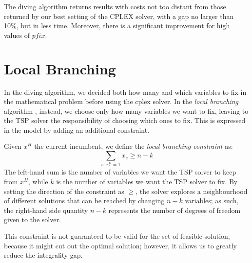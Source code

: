 The diving algorithm returns results with costs not too distant from those returned by our best setting of the CPLEX solver, with a gap no larger than 10\%, but in less time. Moreover, there is a significant improvement for high values of $pfix$.

\section{Local Branching}

In the diving algorithm, we decided both how many and which variables to fix in the mathematical problem before using the cplex solver. In the \textit{local branching} algorithm \cite{Fischetti2003}, instead, we choose only how many variables we want to fix, leaving to the TSP solver the responsibility of choosing which ones to fix. This is expressed in the model by adding an additional constraint.

Given $x^H$ the current incumbent, we define the \textit{local branching constraint} as:
$$\sum_{e:x^H_e=1}x_e\geq n-k$$
The left-hand sum is the number of variables we want the TSP solver to keep from $x^H$, while $k$ is the number of variables we want the TSP solver to fix. By setting the direction of the constraint as $\geq$, the solver explores a neighbourhood of different solutions that can be reached by changing $n-k$ variables; as such, the right-hand side quantity $n-k$ represents the number of degrees of freedom given to the solver.

This constraint is not guaranteed to be valid for the set of feasible solution, because it might cut out the optimal solution; however, it allows us to greatly reduce the integrality gap.
\newpage
\FloatBarrier

